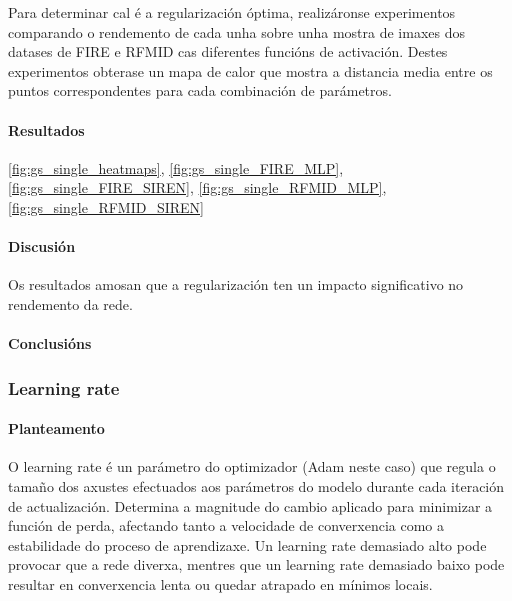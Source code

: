 Para determinar cal é a regularización óptima, realizáronse experimentos comparando o rendemento de cada unha sobre unha mostra de imaxes dos datases de FIRE e RFMID cas diferentes funcións de activación.
Destes experimentos obterase un mapa de calor que mostra a distancia media entre os puntos correspondentes para cada combinación de parámetros.

\paragraph{Resultados}
\label{par:Resultados-regularization}

\ref{fig:gs_single_heatmaps}, \ref{fig:gs_single_FIRE_MLP}, \ref{fig:gs_single_FIRE_SIREN}, \ref{fig:gs_single_RFMID_MLP}, \ref{fig:gs_single_RFMID_SIREN}

\paragraph{Discusión}
\label{par:Discusion-regularization}

Os resultados amosan que a regularización ten un impacto significativo no rendemento da rede.

\paragraph{Conclusións}
\label{par:Conclusions-regularization}

\subsubsection{Learning rate}
\label{subsubsec:Learning rate}

\paragraph{Planteamento}
\label{par:Planteamento-learningrate}

O learning rate é un parámetro do optimizador (Adam neste caso) que regula o tamaño dos axustes efectuados aos parámetros do modelo durante cada iteración de actualización. Determina a magnitude do cambio aplicado para minimizar a función de perda, afectando tanto a velocidade de converxencia como a estabilidade do proceso de aprendizaxe.
Un learning rate demasiado alto pode provocar que a rede diverxa, mentres que un learning rate demasiado baixo pode resultar en converxencia lenta ou quedar atrapado en mínimos locais.

